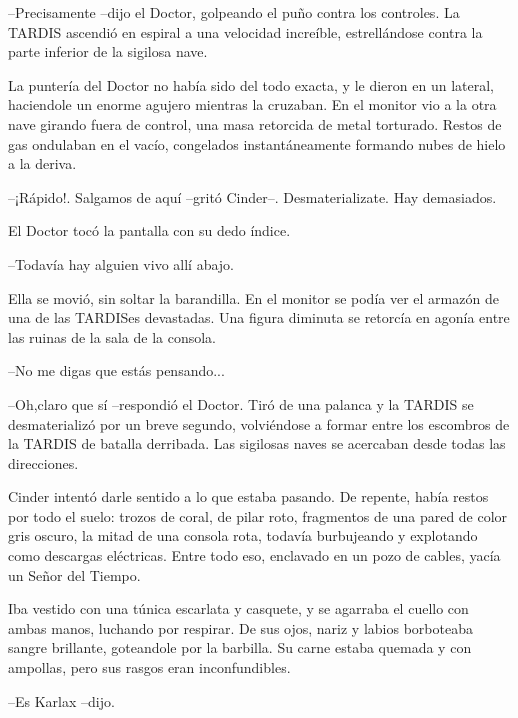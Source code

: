 --Precisamente --dijo el Doctor, golpeando el puño contra los controles. La TARDIS ascendió en espiral a una velocidad increíble, estrellándose contra la parte inferior de la sigilosa nave.



La puntería del Doctor no había sido del todo exacta, y le dieron en un lateral, haciendole un enorme agujero mientras la cruzaban. En el monitor vio a la otra nave girando fuera de control, una masa retorcida de metal torturado. Restos de gas ondulaban en el vacío, congelados instantáneamente formando nubes de hielo a la deriva.



--¡Rápido!. Salgamos de aquí --gritó Cinder--. Desmaterializate. Hay demasiados.



El Doctor tocó la pantalla con su dedo índice. 



--Todavía hay alguien vivo allí abajo.



Ella se movió, sin soltar la barandilla. En el monitor se podía ver el armazón de una de las TARDISes devastadas. Una figura diminuta se retorcía en agonía entre las ruinas de la sala de la consola.



--No me digas que estás pensando...

--Oh,claro que sí --respondió el Doctor. Tiró de una palanca y la TARDIS se desmaterializó por un breve segundo, volviéndose a formar entre los escombros de la TARDIS de batalla derribada. Las sigilosas naves se acercaban desde todas las direcciones.



Cinder intentó darle sentido a lo que estaba pasando. De repente, había restos por todo el suelo: trozos de coral, de pilar roto, fragmentos de una pared de color gris oscuro, la mitad de una consola rota, todavía burbujeando y explotando como descargas eléctricas. Entre todo eso, enclavado en un pozo de cables, yacía un Señor del Tiempo.

Iba vestido con una túnica escarlata y casquete, y se agarraba el cuello con ambas manos, luchando por respirar. De sus ojos, nariz y labios borboteaba sangre brillante, goteandole por la barbilla. Su carne estaba quemada y con ampollas, pero sus rasgos eran inconfundibles. 



--Es Karlax --dijo.

